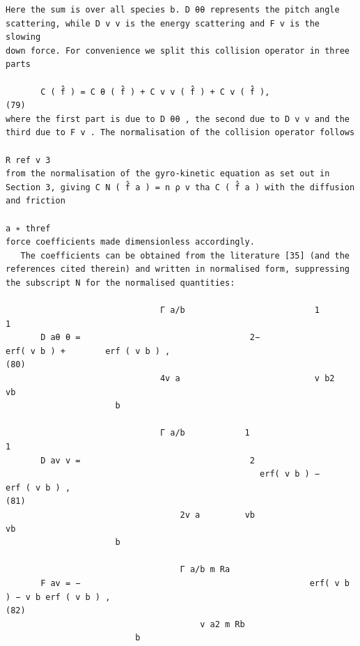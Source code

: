 \documentclass[a4paper]{article}
\newcommand{\gkwpagefont}{\fontsize{6.0pt}{7.55pt}\selectfont}
\begin{document}
\begin{Verbatim}[fontsize=\gkwpagefont]
Here the sum is over all species b. D θθ represents the pitch angle scattering, while D v v is the energy scattering and F v is the slowing
down force. For convenience we split this collision operator in three parts

       C ( f̂ ) = C θ ( f̂ ) + C v v ( f̂ ) + C v ( f̂ ),                                                                                                              (79)
where the first part is due to D θθ , the second due to D v v and the third due to F v . The normalisation of the collision operator follows
                                                                                                                                                           R ref v 3
from the normalisation of the gyro-kinetic equation as set out in Section 3, giving C N ( f̂ a ) = n ρ v tha C ( f̂ a ) with the diffusion and friction
                                                                                                    a ∗ thref
force coefficients made dimensionless accordingly.
   The coefficients can be obtained from the literature [35] (and the references cited therein) and written in normalised form, suppressing
the subscript N for the normalised quantities:
                                                                                                      
                               Γ a/b                          1                           1
       D aθ θ =                                  2−                       erf( v b ) +        erf ( v b ) ,                                                            (80)
                               4v a                           v b2                       vb
                      b
                                                                                             
                               Γ a/b            1                             1
       D av v =                                  2
                                                   erf( v b ) −                   erf ( v b ) ,                                                                        (81)
                                   2v a         vb                           vb
                      b

                                   Γ a/b m Ra
       F av = −                                              erf( v b ) − v b erf ( v b ) ,                                                                            (82)
                                       v a2 m Rb
                          b


\end{Verbatim}
\end{document}
